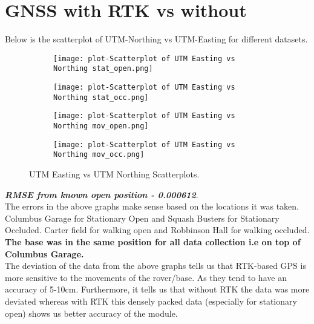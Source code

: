 \documentclass[a4paper]{article}
\begin{document}
\section{GNSS with RTK vs without}
Below is the scatterplot of UTM-Northing vs UTM-Easting for different datasets.
\begin{figure}[h]
\begin{subfigure}{}
     \texttt{[image: plot-Scatterplot of UTM Easting vs Northing stat\_open.png]}
\end{subfigure}
\begin{subfigure}{}
    \texttt{[image: plot-Scatterplot of UTM Easting vs Northing stat\_occ.png]}
\end{subfigure}
\begin{subfigure}{}
    \texttt{[image: plot-Scatterplot of UTM Easting vs Northing mov\_open.png]}
\end{subfigure}
\begin{subfigure}{}
    \texttt{[image: plot-Scatterplot of UTM Easting vs Northing mov\_occ.png]}
\end{subfigure}
\caption{UTM Easting vs UTM Northing Scatterplots.}
\label{Fig 1: UTM Easting vs UTM Northing Scatterplots.}
\end{figure}
\textbf{\textit{RMSE from known open position - 0.000612}}.\\
The errors in the above graphs make sense based on the locations it was taken.
Columbus Garage for Stationary Open and Squash Busters for Stationary Occluded. Carter field for walking open and Robbinson Hall for walking occluded. \textbf{The base was in the same position for all data collection i.e on top of Columbus Garage.}\\
The deviation of the data from the above graphs tells us that RTK-based GPS is more sensitive to the movements of the rover/base. As they tend to have an accuracy of 5-10cm. Furthermore, it tells us that without RTK the data was more deviated whereas with RTK this densely packed data (especially for stationary open) shows us better accuracy of the module.
\end{document}
